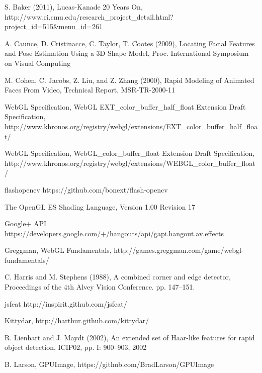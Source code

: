 \documentclass[a4paper]{article}
\begin{document}
\begin{thebibliography}{9}


 S. Baker (2011),
 Lucas-Kanade 20 Years On,
 http://www.ri.cmu.edu/research\_project\_detail.html?project\_id=515&menu\_id=261

  A. Caunce, D. Cristinacce, C. Taylor, T. Cootes (2009),
  Locating Facial Features and Pose Estimation Using a 3D Shape Model, 
  Proc. International Symposium on Visual Computing

  M. Cohen, C. Jacobs, Z. Liu, and Z. Zhang (2000),
  Rapid Modeling of Animated Faces From Video,
  Technical Report,
  MSR-TR-2000-11

  WebGL Specification,
  WebGL EXT\_color\_buffer\_half\_float Extension Draft Specification,
  http://www.khronos.org/registry/webgl/extensions/EXT\_color\_buffer\_half\_float/

  WebGL Specification,
  WebGL\_color\_buffer\_float Extension Draft Specification,
  http://www.khronos.org/registry/webgl/extensions/WEBGL\_color\_buffer\_float/

 flashopencv
 https://github.com/bonext/flash-opencv

  The OpenGL ES Shading Language,
  Version 1.00 Revision 17

  Google+ API
  https://developers.google.com/+/hangouts/api/gapi.hangout.av.effects

  Greggman,
  WebGL Fundamentals,
  http://games.greggman.com/game/webgl-fundamentals/

  C. Harris and M. Stephens (1988),
  A combined corner and edge detector,
  Proceedings of the 4th Alvey Vision Conference. pp. 147–151.

jsfeat
http://inspirit.github.com/jsfeat/


  Kittydar,
  http://harthur.github.com/kittydar/


 R. Lienhart and J. Maydt (2002),
 An extended set of Haar-like features for rapid object detection,
 ICIP02, pp. I: 900–903, 2002


  B. Larson,
  GPUImage,
  https://github.com/BradLarson/GPUImage


\end{thebibliography}
\end{document}
